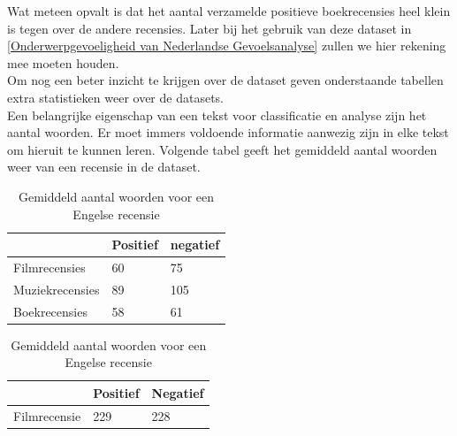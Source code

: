 Wat meteen opvalt is dat het aantal verzamelde positieve boekrecensies heel klein is tegen over de andere recensies. Later bij het gebruik van deze dataset in \ref{Onderwerpgevoeligheid van Nederlandse Gevoelsanalyse} zullen we hier rekening mee moeten houden.\\

Om nog een beter inzicht te krijgen over de dataset geven onderstaande tabellen extra statistieken weer over de datasets.\\

Een belangrijke eigenschap van een tekst voor classificatie en analyse zijn het aantal woorden. Er moet immers voldoende informatie aanwezig zijn in elke tekst om hieruit te kunnen leren. Volgende tabel geeft het gemiddeld aantal woorden weer van een recensie in de dataset.

\begin{table}[h]
\centering
\setlength\tabcolsep{2pt}
\begin{minipage}[t]{0.48\textwidth}
\centering

\begin{tabular}{l|l|l|}
\cline{2-3}
                & Positief & negatief \\ \hline
\multicolumn{1}{|l|}{Filmrecensies}   & 60       & 75       \\ \hline
\multicolumn{1}{|l|}{Muziekrecensies} & 89       & 105      \\ \hline
\multicolumn{1}{|l|}{Boekrecensies}   & 58       & 61    \\ \hline   
\end{tabular}

\caption{Gemiddeld aantal woorden voor een Nederlandse recensie} 
\label{tabel: Gemiddeld aantal woorden per recensie Nederlands}
\end{minipage}%
\hfill
\begin{minipage}[t]{0.48\textwidth}
\centering

\begin{tabular}{l|l|l|}
\cline{2-3}
                                   & Positief & Negatief \\ \hline
\multicolumn{1}{|l|}{Filmrecensie} & 229      & 228      \\ \hline
\end{tabular}
\caption{Gemiddeld aantal woorden voor een Engelse recensie}
\label{tabel: Gemiddeld aantal woorden per recensie Engels}
\end{minipage}
\end{table} 

